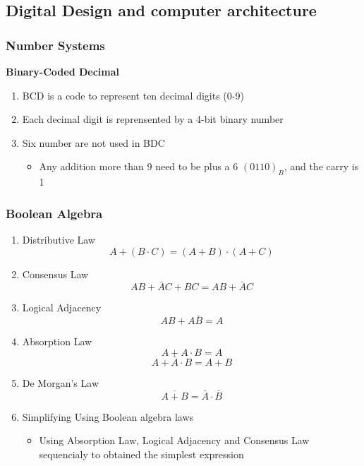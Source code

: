 \subsection{Digital Design and computer architecture}
\subsubsection{Number Systems}
\textbf{Binary-Coded Decimal}
\begin{enumerate}
    \item BCD is a code to represent ten decimal digits (0-9)
    \item Each decimal digit is reprensented by a 4-bit binary number
    \item Six number are not used in BDC
        \begin{itemize}
            \item Any addition more than 9 need to be plus a 6 $(0110)_{B}$, and the carry is 1
        \end{itemize}
    
\end{enumerate}
\subsubsection{Boolean Algebra}
\begin{enumerate}
    \item Distributive Law
    \[A + (B \cdot C)=(A+B)\cdot(A+C)\]
    \item Consensus Law
    \[AB + \bar{A}C+BC=AB+\bar{A}C\]
    \item Logical Adjacency
    \[AB+A\bar{B}=A\]
    \item Absorption Law
    \[A+A\cdot B=A\]
    \[A+\bar{A} \cdot B=A+B\]
    \item De Morgan's Law
    \[\overline{A+B}=\bar{A} \cdot \bar{B}\]
    \item Simplifying Using Boolean algebra laws
    \begin{itemize}
        \item Using Absorption Law, Logical Adjacency and Consensus Law sequencialy to obtained the simplest expression
    \end{itemize}
\end{enumerate}

